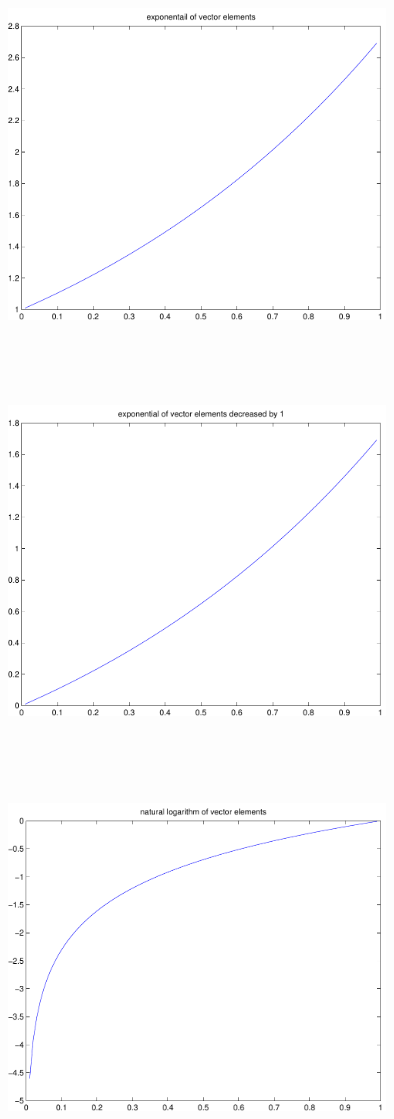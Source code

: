 \documentclass[9pt]{article}
\theoremstyle{plain}
\theoremstyle{definition}
\theoremstyle{remark}
\numberwithin{equation}{section}
\begin{document}
\includegraphics[width=10.0cm,height=10.0cm]{klVSLExp.pdf}

\includegraphics[width=10.0cm,height=10.0cm]{klVSLExpm1.pdf}

\includegraphics[width=10.0cm,height=10.0cm]{klVSLLn.pdf}
\end{document}
